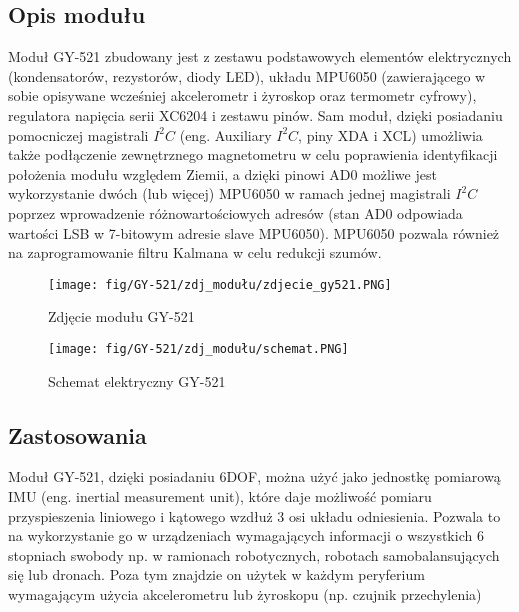 \documentclass[11pt, a4paper]{article}
\begin{document}
\subsection{Opis modułu}
Moduł GY-521 zbudowany jest z zestawu podstawowych elementów elektrycznych (kondensatorów, rezystorów, diody LED), układu MPU6050 (zawierającego w sobie opisywane wcześniej akcelerometr i żyroskop oraz termometr cyfrowy), regulatora napięcia serii XC6204 i zestawu pinów. Sam moduł, dzięki posiadaniu pomocniczej magistrali $I^2C$ (eng. Auxiliary $I^2C$, piny XDA i XCL) umożliwia także podłączenie zewnętrznego magnetometru w celu poprawienia identyfikacji położenia modułu względem Ziemii, a dzięki pinowi AD0 możliwe jest wykorzystanie dwóch (lub więcej) MPU6050 w ramach jednej magistrali $I^2C$ poprzez wprowadzenie różnowartościowych adresów (stan AD0 odpowiada wartości LSB w 7-bitowym adresie slave MPU6050). MPU6050 pozwala również na zaprogramowanie filtru Kalmana w celu redukcji szumów.

\vspace{0.3cm}
\begin{figure}[H]
\centering
\texttt{[image: fig/GY-521/zdj\_modułu/zdjecie\_gy521.PNG]}
\caption{Zdjęcie modułu GY-521}
\label{zdj_2}
\end{figure}
\vspace{0.3cm}
\vspace{0.3cm}
\begin{figure}[H]
\centering
\texttt{[image: fig/GY-521/zdj\_modułu/schemat.PNG]}
\caption{Schemat elektryczny GY-521}
\label{fig:sub3}
\end{figure}
\vspace{0.3cm}

\subsection{Zastosowania}
Moduł GY-521, dzięki posiadaniu 6DOF, można użyć jako jednostkę pomiarową IMU (eng. inertial measurement unit), które daje możliwość pomiaru przyspieszenia liniowego i kątowego wzdłuż 3 osi układu odniesienia. Pozwala to na wykorzystanie go w urządzeniach wymagających informacji o wszystkich 6 stopniach swobody np. w ramionach robotycznych, robotach samobalansujących się lub dronach. Poza tym znajdzie on użytek w każdym peryferium wymagającym użycia akcelerometru lub żyroskopu (np. czujnik przechylenia)


\newpage
{}
\end{document}
